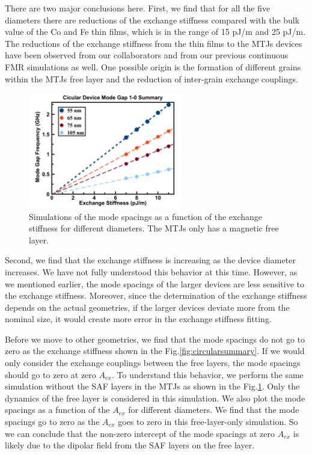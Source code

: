 There are two major conclusions here. First, we find that for all the five diameters there are reductions of the exchange stiffness compared with the bulk value of the Co and Fe thin films, which is in the range of 15 pJ/m and 25 pJ/m. The reductions of the exchange stiffness from the thin films to the MTJs devices have been observed from our collaborators and from our previous continuous FMR simulations as well. One possible origin is the formation of different grains within the MTJs free layer and the reduction of inter-grain exchange couplings.


\begin{figure}[!ht]
  \centering
  \includegraphics[width=0.6\textwidth]{fig/2018/sim/free_only_circular}
   \caption{Simulations of the mode spacings as a function of the exchange stiffness for different diameters. The MTJs only has a magnetic free layer.}
  \label{fig:freecircularsummary}
\end{figure}

Second, we find that the exchange stiffness is increasing as the device diameter increases. We have not fully understood this behavior at this time. However, as we mentioned earlier, the mode spacings of the larger devices are less sensitive to the exchange stiffness. Moreover, since the determination of the exchange stiffness depends on the actual geometries, if the larger devices deviate more from the nominal size, it would create more error in the exchange stiffness fitting.

Before we move to other geometries, we find that the mode spacings do not go to zero as the exchange stiffness shown in the Fig.\ref{fig:circularsummary}. If we would only consider the exchange couplings between the free layers, the mode spacings should go to zero at zero $A_{ex}$. To understand this behavior, we perform the same simulation without the SAF layers in the MTJs as shown in the Fig.\ref{fig:freecircularsummary}. Only the dynamics of the free layer is considered in this simulation. We also plot the mode spacings as a function of the $A_{ex}$ for different diameters. We find that the mode spacings go to zero as the $A_{ex}$ goes to zero in this free-layer-only simulation.  So we can conclude that the non-zero intercept of the mode spacings at zero $A_{ex}$ is likely due to the dipolar field from the SAF layers on the free layer.

